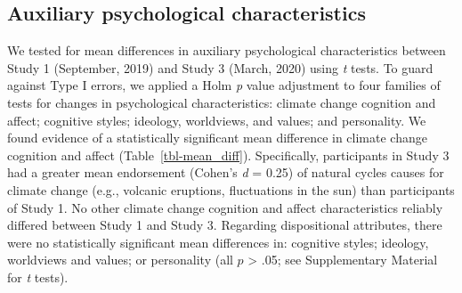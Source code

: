 \documentclass[
  letterpaper,
  DIV=11,
  numbers=noendperiod]{scrartcl}
\begin{document}
\hypertarget{auxiliary-psychological-characteristics}{%
\subsection{Auxiliary psychological
characteristics}\label{auxiliary-psychological-characteristics}}

We tested for mean differences in auxiliary psychological
characteristics between Study 1 (September, 2019) and Study 3 (March,
2020) using \emph{t} tests. To guard against Type I errors, we applied a
Holm \citeyearpar{holm1979} \emph{p} value adjustment to four families
of tests for changes in psychological characteristics: climate change
cognition and affect; cognitive styles; ideology, worldviews, and
values; and personality. We found evidence of a statistically
significant mean difference in climate change cognition and affect
(Table~\ref{tbl-mean_diff}). Specifically, participants in Study 3 had a
greater mean endorsement (Cohen's \emph{d} = 0.25) of natural cycles
causes for climate change (e.g., volcanic eruptions, fluctuations in the
sun) than participants of Study 1. No other climate change cognition and
affect characteristics reliably differed between Study 1 and Study 3.
Regarding dispositional attributes, there were no statistically
significant mean differences in: cognitive styles; ideology, worldviews
and values; or personality (all \(p\) \textgreater{} .05; see
Supplementary Material for \emph{t} tests).
\end{document}
